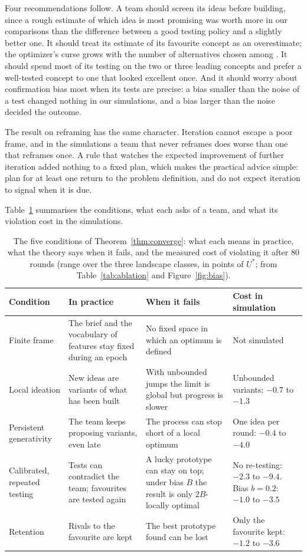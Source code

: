 \documentclass[10pt,twocolumn]{article}
\theoremstyle{definition}
\begin{document}
Four recommendations follow. A team should screen its ideas before building, since a rough estimate of which idea is most promising was worth more in our comparisons than the difference between a good testing policy and a slightly better one. It should treat its estimate of its favourite concept as an overestimate; the optimizer's curse grows with the number of alternatives chosen among \citep{smithwinkler2006}. It should spend most of its testing on the two or three leading concepts and prefer a well-tested concept to one that looked excellent once. And it should worry about confirmation bias most when its tests are precise: a bias smaller than the noise of a test changed nothing in our simulations, and a bias larger than the noise decided the outcome.

The result on reframing has the same character. Iteration cannot escape a poor frame, and in the simulations a team that never reframes does worse than one that reframes once. A rule that watches the expected improvement of further iteration added nothing to a fixed plan, which makes the practical advice simple: plan for at least one return to the problem definition, and do not expect iteration to signal when it is due.

Table~\ref{tab:conditions} summarises the conditions, what each asks of a team, and what its violation cost in the simulations.

\begin{table}[t]
\caption{The five conditions of Theorem~\ref{thm:converge}: what each means in practice, what the theory says when it fails, and the measured cost of violating it after 80 rounds (range over the three landscape classes, in points of $U^*$; from Table~\ref{tab:ablation} and Figure~\ref{fig:bias}).}
\label{tab:conditions}
\centering\small
\begin{tabularx}{\textwidth}{@{}p{2.6cm}XXp{3.9cm}@{}}
\toprule
Condition & In practice & When it fails & Cost in simulation\\
\midrule
Finite frame & The brief and the vocabulary of features stay fixed during an epoch & No fixed space in which an optimum is defined & Not simulated\\
Local ideation & New ideas are variants of what has been built & With unbounded jumps the limit is global but progress is slower & Unbounded variants: $-0.7$ to $-1.3$\\
Persistent generativity & The team keeps proposing variants, even late & The process can stop short of a local optimum & One idea per round: $-0.4$ to $-4.0$\\
Calibrated, repeated testing & Tests can contradict the team; favourites are tested again & A lucky prototype can stay on top; under bias $B$ the result is only $2B$-locally optimal & No re-testing: $-2.3$ to $-9.4$. Bias $b=0.2$: $-1.0$ to $-3.5$\\
Retention & Rivals to the favourite are kept & The best prototype found can be lost & Only the favourite kept: $-1.2$ to $-3.6$\\
\bottomrule
\end{tabularx}
\end{table}
\end{document}
